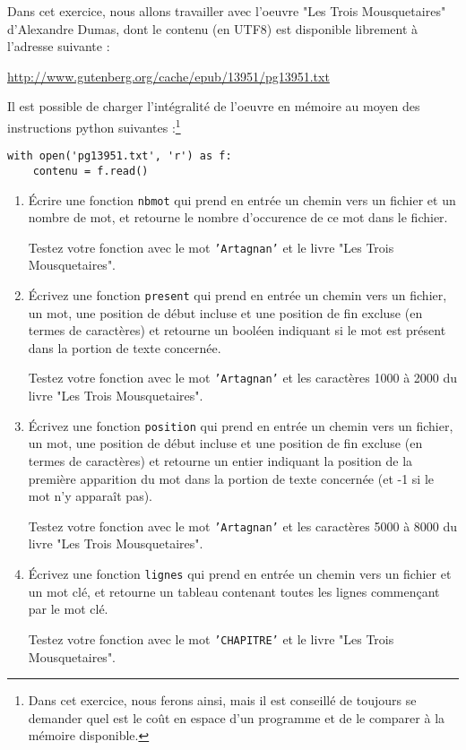 \documentclass[10pt,a4paper]{sujets-exercices}
\begin{document}

Dans cet exercice, nous allons travailler avec l'oeuvre "Les Trois Mousquetaires" d'Alexandre Dumas, dont le contenu (en UTF8) est disponible librement à l'adresse suivante :
\begin{center}
	\url{http://www.gutenberg.org/cache/epub/13951/pg13951.txt}
\end{center}

Il est possible de charger l'intégralité de l'oeuvre en mémoire au moyen des instructions python suivantes :\footnote{Dans cet exercice, nous ferons ainsi, mais il est conseillé de toujours se demander quel est le coût en espace d'un programme et de le comparer à la mémoire disponible.} 
\begin{verbatim}
with open('pg13951.txt', 'r') as f:
    contenu = f.read()
\end{verbatim}
\begin{enumerate}
\item Écrire une fonction \verb!nbmot! qui prend en entrée un chemin vers un fichier et un nombre de mot, et retourne le nombre d'occurence de ce mot dans le fichier.

Testez votre fonction avec le mot \texttt{'Artagnan'} et le livre "Les Trois Mousquetaires".

\item Écrivez une fonction \verb!present! qui prend en entrée un chemin vers un fichier, un mot, une position de début incluse et une position de fin excluse (en termes de caractères) et retourne un booléen indiquant si le mot est présent dans la portion de texte concernée.

Testez votre fonction avec le mot \texttt{'Artagnan'} et les caractères 1000 à 2000 du livre "Les Trois Mousquetaires".

\item Écrivez une fonction \verb!position! qui prend en entrée un chemin vers un fichier, un mot, une position de début incluse et une position de fin excluse (en termes de caractères) et retourne un entier indiquant la position de la première apparition du mot dans la portion de texte concernée (et -1 si le mot n'y apparaît pas).

Testez votre fonction avec le mot \texttt{'Artagnan'} et les caractères 5000 à 8000 du livre "Les Trois Mousquetaires".

\item Écrivez une fonction \verb!lignes! qui prend en entrée un chemin vers un fichier et un mot clé, et retourne un tableau contenant toutes les lignes commençant par le mot clé.

Testez votre fonction avec le mot \texttt{'CHAPITRE'} et le livre "Les Trois Mousquetaires".
\end{enumerate}
\end{document}
